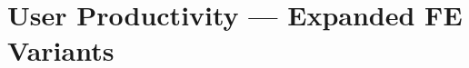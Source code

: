 \documentclass{article}
\newcommand{\cleaned}{../results/cleaned/tex}
\newcommand{\TableInput}[1]{}
\begin{document}
\section*{User Productivity — Expanded FE Variants}

\begin{table}[h]
  \centering
  \caption{Remote Work and Individual Productivity (Expanded FE) -- OLS}
  \TableInput{\cleaned/user_productivity_precovid_fe_expanded_ols.tex}
\end{table}

\begin{table}[h]
  \centering
  \caption{Remote Work and Individual Productivity (Expanded FE) -- IV}
  \TableInput{\cleaned/user_productivity_precovid_fe_expanded_iv.tex}
\end{table}
\end{document}
